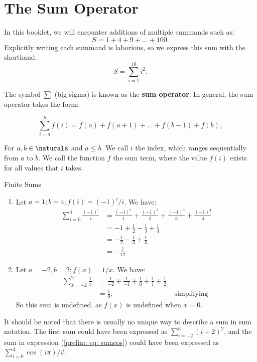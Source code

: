 \newcommand{\negfrac}[1]{\frac{ (-1)^{#1} }{ #1 } }

\section{The Sum Operator}
In this booklet, we will encounter additions of multiple summands such as:
$$ S = 1 + 4 + 9 + ... + 100. $$
Explicitly writing each summand is laborious, so we express this sum
with the shorthand: $$ S = \sum_{i=1}^{10}{i^2}. $$

The symbol $\sum$ (big sigma) is known as the \textbf{sum operator}. In
general, the sum operator takes the form:

$$ \sum_{i=a}^{b} f(i) = f(a) + f(a+1) + \ldots + f(b-1) + f(b),$$

For $a, b \in \naturals$ and $a \leq b$. We call $i$ the index, which ranges
sequentially from $a$ to $b$. We call the function $f$ the sum term, where
the value $f(i)$ exists for all values that $i$ takes.

\begin{expl}{Finite Sums}
  \begin{enumerate}
    \item Let $a = 1; b = 4; f(i) = (-1)^i/i$. We have:
    \begin{align}
      \sum_{i=0}^{4} \frac{ (-1)^i }{ i }
        &= \negfrac{1} + \negfrac{2}
        + \negfrac{3} + \negfrac{4}  \label{prelim: eq: sumcos} \\
        &= - 1 + \frac{1}{2} - \frac{1}{3} + \frac{1}{4} \\
        &= -\frac{1}{2} - \frac{1}{3} + \frac{1}{4} \\
        &= -\frac{7}{12}
    \end{align}

    \item Let $a = -2, b = 2; f(x) = 1/x$. We have:
    \begin{align}
      \sum_{x=-2}^{2} \frac{1}{x}
        &= \frac{1}{-2} + \frac{1}{-1} + \frac{1}{0} + \frac{1}{1}
        + \frac{1}{2} \\
        &= \frac{1}{0}, & \text{ simplifying }
    \end{align}
    So this sum is undefined, as $f(x)$ is undefined when $x = 0$.
  \end{enumerate}
\end{expl}

It should be noted that there is usually no unique way to describe a sum in
sum notation. The first sum could have been expressed as
$\sum_{i=-2}^{6}{(i+2)^2}$, and the sum in expression
(\ref{prelim: eq: sumcos}) could have been expressed as
$\sum_{i=0}^{4}{ \cos(i\pi) / {i!} }.$

